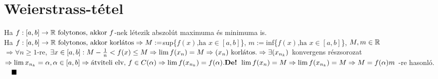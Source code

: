 \documentclass[a4paper,11pt]{article}
\begin{document}
\section{Weierstrass-tétel}
\tetel Ha $ f:[a,b]\to\mathbb{R}\text{ folytonos, akkor } f$-nek
létezik abszolút maximuma és minimuma is.\\[0.1cm]
\biz Ha $ f:[a,b]\to\mathbb{R}\text{ folytonos, akkor korlátos} \\[0.1cm]\Rightarrow 
M:=$sup\{$f(x)\text{,ha } x\in[a,b]$\}, $m:=$inf\{$f(x)\text{,ha }x\in[a,b]$\},
$M,m\in\mathbb{R}$\\[0.1cm] $\Rightarrow\forall n\geq1$-re, $\exists x\in[a,b]:
M -\frac{1}{n}<f(x)\leq M\\[0.1cm]\Rightarrow\lim f(x_n)=M\Rightarrow(x_n)
\text{ korlátos.}\\[0.1cm]\Rightarrow\exists(x_{n_k})$ konvergens részsorozat$ 
\Rightarrow\lim x_{n_k}=\alpha,\alpha\in[a,b]\Rightarrow\text{átviteli elv, }
f\in C(\alpha)\\[0.1cm]\Rightarrow\lim f(x_{n_k})=f(\alpha).\\[0.1cm]
\text{\textbf{De!} }\lim f(x_n)=M\Rightarrow\lim f(x_{n_k})=M\Rightarrow
M=f(\alpha)\\[0.1cm]m$ -re hasonló.$\quad\blacksquare$
\end{document}
